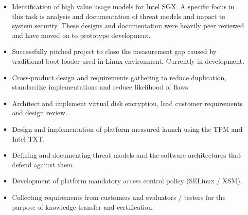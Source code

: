 \documentclass[letterpaper,11pt]{article}
\begin{document}
    \begin {itemize}
      \setlength {\itemsep}{1pt}
      \setlength {\parskip}{0pt}
      \setlength {\parsep}{0pt}
      \item Identification of high value usage models for Intel\textsuperscript{\textregistered} SGX.
            A specific focus in this task is analysis and documentation of threat models and impact to system security.
            These designs and documentation were heavily peer reviewed and have moved on to prototype development.
      \item Successfully pitched project to close the measurement gap caused by traditional boot loader used in Linux environment.
            Currently in development.
    \end {itemize}
    \begin {itemize}
        \setlength {\itemsep}{1pt}
        \setlength {\parskip}{0pt}
        \setlength {\parsep}{0pt}
      \item Cross-product design and requirements gathering to reduce duplication, standardize implementations and reduce likelihood of flaws.
      \item Architect and implement virtual disk encryption, lead customer requirements and design review.
    \end {itemize}
    \begin {itemize}
        \setlength {\itemsep}{1pt}
        \setlength {\parskip}{0pt}
        \setlength {\parsep}{0pt}
      \item Design and implementation of platform measured launch using the TPM and Intel\textsuperscript{\textregistered} TXT.
      \item Defining and documenting threat models and the software architectures that defend against them.
      \item Development of platform mandatory access control policy (SELinux / XSM).
      \item Collecting requirements from customers and evaluators / testers for the purpose of knowledge transfer and certification.
    \end {itemize}
\end{document}
